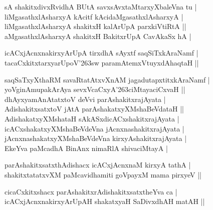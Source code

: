 \begin{entry}
\smallskip
\begin{shl}
sA shakitxdivxRvidhA BUtA savxsAvxtaMtarxyXbaleVna tu |\\
liMgasathxlAsharxyA kAcitf kAcidaMgasathxlAsharxyA |\\
liMgasathxlAsharxyA shakitxH kalArUpA parxkiVtiRtA ||\\
aMgasathxlAsharxyA shakitxH BakitxrUpA CavAkaSx hA |
\end{shl}
\smallskip
\begin{shl}
icACxjAcnxnakirxyArUpA tirxdhA sAyxtf saqSiTxkAraNamf |\\
tacaCxkitxtarxyarUpoV{\char'263}sw paramAtemxVtuyxdAhaqtaH ||
\end{shl}
\medskip
{}
\smallskip
\begin{shl}
saqSaTxyXthaRM savaRtatAtxvXnAM jagadutapxtitxkAraNamf |\\
yoVginAmupakArAya sevxVcaCxyA{\char'263}ciMtayaciCxvaH ||\\
dhAyxyamAnAtatxtoV deVvi parAshakitxrajAyata |\\
AdishakitxsatxtoV jAtA parAshakatxyXMshaBeVdataH ||\\
AdishakatxyXMshataH sAkASxdicACxshakitxrajAyata |\\
icACxshakatxyXMshaBeVdeVna jAcnxnashakitxrajAyata |\\
jAcnxnashakatxyXMshaBeVdeVna kirxyAshakitxrajAyata |\\
EkeYva paMcadhA BinAnx nimaRlA shivaciMtayA |
\end{shl}
\medskip
{}
\smallskip
\begin{shl}
parAshakitxsatxthAdishacx icACxjAcnxnaM kirxyA tathA |\\
shakitxtatatxvXM paMcavidhamiti goVpayxM mama pirxyeV ||
\end{shl}
\medskip
{}
\smallskip
\begin{shl}
cicaCxkitxshacx parAshakitxrAdishakitxsatxtheYva ca |\\
icACxjAcnxnakirxyArUpAH shakatxyaH SaDivxdhAH matAH ||
\end{shl}
\medskip
{}

\end{entry}
